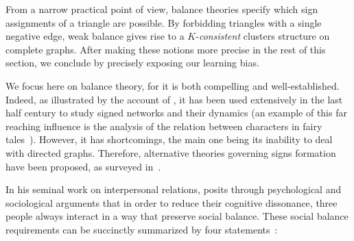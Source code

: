 From a narrow practical point of view, balance theories specify which sign assignments of a triangle
are possible. By forbidding triangles with a single negative edge, weak balance gives rise to a
$K$-\emph{consistent} clusters structure on complete graphs. After making these notions more precise
in the rest of this section, we conclude by precisely exposing our learning bias.

\begin{aside}
We focus here on balance theory, for it is both compelling and well-established.
Indeed, as illustrated by the account of \textcite{CSBalanceSurvey15}, it has been used extensively
in the last half century to study signed networks and their dynamics (an example of this far
reaching influence is the analysis of the relation between characters in fairy
tales~\autocite{fairyTales80}).
However, it has shortcomings, the main one being its inability to deal with directed graphs.
Therefore, alternative theories governing signs formation have been proposed, as surveyed
in~\autocite{Yap2015}.
\end{aside}

In his seminal work on interpersonal relations,
\textcite{Heider46} posits through
psychological and sociological arguments that in order to reduce their cognitive dissonance, three
people always interact in a way that preserve social balance. These social balance requirements can be
succinctly summarized by four statements~\autocite{HeiderBook58}:

